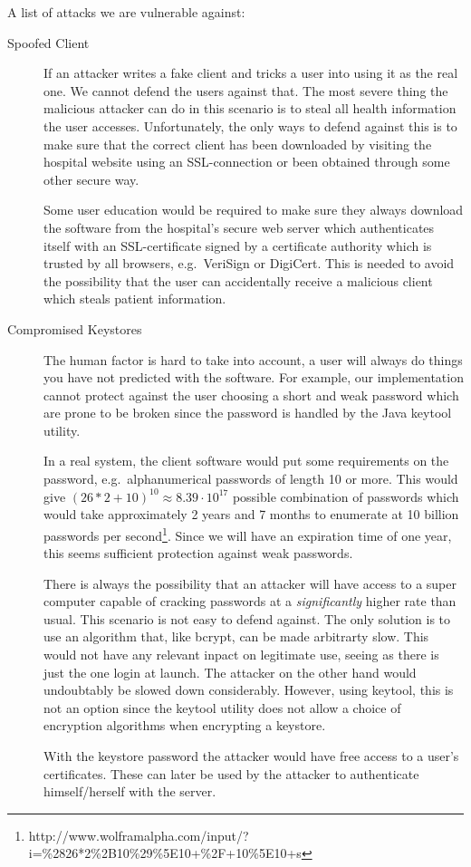 \documentclass[10pt, a4paper]{article}
\begin{document}
A list of attacks we are vulnerable against:
\begin{description}
\item[Spoofed Client] If an attacker writes a fake client and tricks a user into using it as the real one. We cannot defend the users against that. The most severe thing the malicious attacker can do in this scenario is to steal all health information the user accesses. Unfortunately, the only ways to defend against this is to make sure that the correct client has been downloaded by visiting the hospital website using an SSL-connection or been obtained through some other secure way.

Some user education would be required to make sure they always download the software from the hospital's secure web server which authenticates itself with an SSL-certificate signed by a certificate authority which is trusted by all browsers, e.g.~VeriSign or DigiCert. This is needed to avoid the possibility that the user can accidentally receive a malicious client which steals patient information.

\item[Compromised Keystores]The human factor is hard to take into account, a user will always do things you have not predicted with the software. For example, our implementation cannot protect against the user choosing a short and weak password which are prone to be broken since the password is handled by the Java keytool utility.

In a real system, the client software would put some requirements on the password, e.g.~alphanumerical passwords of length 10 or more. This would give $(26*2 + 10)^{10} \approx 8.39\cdot 10^{17}$ possible combination of passwords which would take approximately 2 years and 7 months to enumerate at 10 billion passwords per second\footnote{http://www.wolframalpha.com/input/?i=\%2826*2\%2B10\%29\%5E10+\%2F+10\%5E10+s}. Since we will have an expiration time of one year, this seems sufficient protection against weak passwords.

There is always the possibility that an attacker will have access to a super computer capable of cracking passwords at a \emph{significantly} higher rate than usual. This scenario is not easy to defend against. The only solution is to use an algorithm that, like bcrypt, can be made arbitrarty slow. This would not have any relevant inpact on legitimate use, seeing as there is just the one login at launch. The attacker on the other hand would undoubtably be slowed down considerably. However, using keytool, this is not an option since the keytool utility does not allow a choice of encryption algorithms when encrypting a keystore.

With the keystore password the attacker would have free access to a user's certificates. These can later be used by the attacker to authenticate himself/herself with the server.

\end{description}
\end{document}
